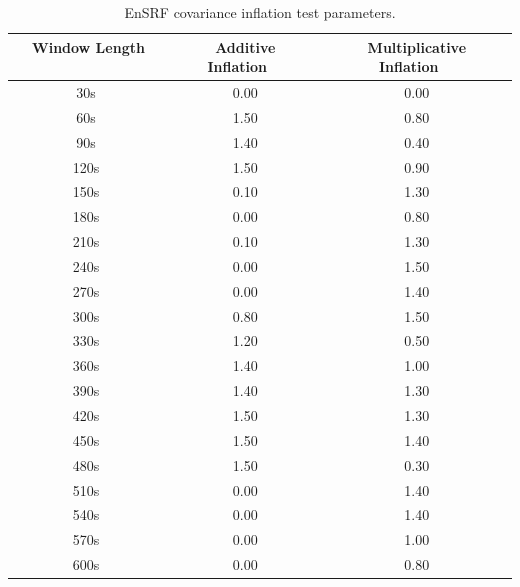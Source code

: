 \begin{table}[h!]
\caption[EnSRF covariance inflation test parameters]{EnSRF covariance inflation test parameters.}
\begin{center}
\begin{tabular}{ccc}
\hline
{\bf Window Length ~~~~} & {\bf Additive Inflation~~} & {\bf Multiplicative Inflation~~}\\
\hline
\hline
~30s ~& 0.00 & 0.00 \\ \hline
~60s ~& 1.50 & 0.80 \\ \hline
~90s ~& 1.40 & 0.40 \\ \hline
~120s ~& 1.50 & 0.90 \\ \hline
~150s ~& 0.10 & 1.30 \\ \hline
~180s ~& 0.00 & 0.80 \\ \hline
~210s ~& 0.10 & 1.30 \\ \hline
~240s ~& 0.00 & 1.50 \\ \hline
~270s ~& 0.00 & 1.40 \\ \hline
~300s ~& 0.80 & 1.50 \\ \hline
~330s ~& 1.20 & 0.50 \\ \hline
~360s ~& 1.40 & 1.00 \\ \hline
~390s ~& 1.40 & 1.30 \\ \hline
~420s ~& 1.50 & 1.30 \\ \hline
~450s ~& 1.50 & 1.40 \\ \hline
~480s ~& 1.50 & 0.30 \\ \hline
~510s ~& 0.00 & 1.40 \\ \hline
~540s ~& 0.00 & 1.40 \\ \hline
~570s ~& 0.00 & 1.00 \\ \hline
~600s ~& 0.00 & 0.80 \\ 
\hline
\end{tabular}
\end{center}
\label{table:EnSRFCovInfl}
\end{table} 


